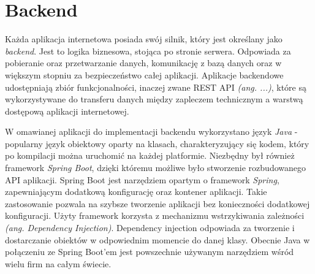 
\section{Backend}
Każda aplikacja internetowa posiada swój silnik, który jest określany jako \textit{backend}. Jest to logika biznesowa, stojąca po stronie serwera. Odpowiada za pobieranie oraz przetwarzanie danych, komunikację z bazą danych oraz w większym stopniu za bezpieczeństwo całej aplikacji. Aplikacje backendowe udostępniają zbiór funkcjonalności, inaczej zwane REST API \textit{(ang. ...)}, które są wykorzystywane do transferu danych między zapleczem technicznym a warstwą dostępową aplikacji internetowej.

W omawianej aplikacji do implementacji backendu wykorzystano język \textit{Java} - popularny język obiektowy oparty na klasach, charakteryzujący się kodem, który po kompilacji można uruchomić na każdej platformie. Niezbędny był również framework \textit{Spring Boot}, dzięki któremu możliwe było stworzenie rozbudowanego API aplikacji. Spring Boot jest narzędziem opartym o framework \textit{Spring}, zapewniającym dodatkową konfigurację oraz kontener aplikacji. Takie zastosowanie pozwala na szybsze tworzenie aplikacji bez konieczności dodatkowej konfiguracji. Użyty framework korzysta z mechanizmu wstrzykiwania zależności \textit{(ang. Dependency Injection)}. Dependency injection odpowiada za tworzenie i dostarczanie obiektów w odpowiednim momencie do danej klasy. Obecnie Java w połączeniu ze Spring Boot'em jest powszechnie używanym narzędziem wśród wielu firm na całym świecie. 

